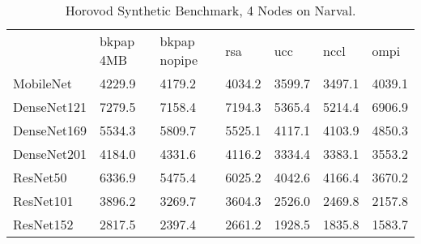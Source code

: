 \begin{table}
    \centering
    \caption{Horovod Synthetic Benchmark, 4 Nodes on Narval.}
    \begin{tabular}{lllllll}
    ~              &    bkpap 4MB &    bkpap nopipe & rsa       & ucc       & nccl      & ompi      \\
       MobileNet   &    4229.9    &    4179.2       & 4034.2    &    3599.7 &    3497.1 &    4039.1 \\
       DenseNet121 &    7279.5    &    7158.4       &    7194.3 &    5365.4 &    5214.4 &    6906.9 \\
       DenseNet169 &    5534.3    &    5809.7       &    5525.1 &    4117.1 &    4103.9 &    4850.3 \\
       DenseNet201 &    4184.0    &    4331.6       &    4116.2 &    3334.4 &    3383.1 &    3553.2 \\
       ResNet50    &    6336.9    &    5475.4       &    6025.2 &    4042.6 &    4166.4 &    3670.2 \\
       ResNet101   &    3896.2    &    3269.7       &    3604.3 &    2526.0 &    2469.8 &    2157.8 \\
       ResNet152   &    2817.5    &    2397.4       &    2661.2 &    1928.5 &    1835.8 &    1583.7 \\
    \end{tabular}
    \label{tbl:ng_hvd_synth_4n}
\end{table}

